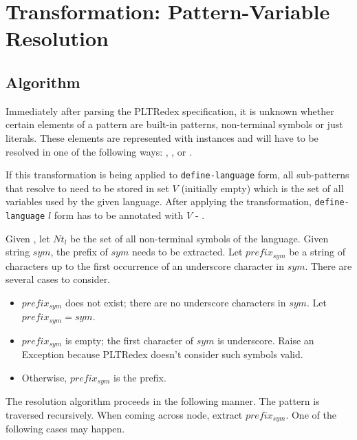 \section{Transformation: Pattern-Variable Resolution}
\label{section:pv-resolve}

\subsection{Algorithm}

Immediately after parsing the PLTRedex specification, it is unknown whether certain elements of a pattern are built-in patterns, non-terminal symbols or just literals. These elements are represented with \UnresolvedSymbol instances and will have to be resolved in one of the following ways: \BuiltInPatternNoArg, \NonTerminalNoArg, or \LiteralPatternNoArg.

If this transformation is being applied to \texttt{define-language} form, all sub-patterns that resolve to \LiteralPatternNoArg \space need to be stored in set $V$ (initially empty) which is the set of all variables used by the given language. After applying the transformation, \texttt{define-language} $l$ form has to be annotated with $V$ - .

Given , let $\mathit{Nt_{l}}$ be the set of all non-terminal symbols of the language. Given string $\mathit{sym}$, the prefix of $\mathit{sym}$ needs to be extracted. Let $\mathit{prefix_{sym}}$ be a string of characters up to the first occurrence of an underscore character in $\mathit{sym}$. There are several cases to consider.

\begin{itemize}
\item $\mathit{prefix_{sym}}$ does not exist; there are no underscore characters in $\mathit{sym}$. Let $\mathit{prefix_{sym}=sym}$.
\item $\mathit{prefix_{sym}}$ is empty; the first character of $\mathit{sym}$ is underscore. Raise an Exception because PLTRedex doesn't consider such symbols valid.
\item Otherwise, $\mathit{prefix_{sym}}$ is the prefix.
\end{itemize}

The resolution algorithm proceeds in the following manner. The pattern is traversed recursively. When coming across \UnresolvedSymbol \space node, extract $\mathit{prefix_{sym}}$. One of the following cases may happen.

